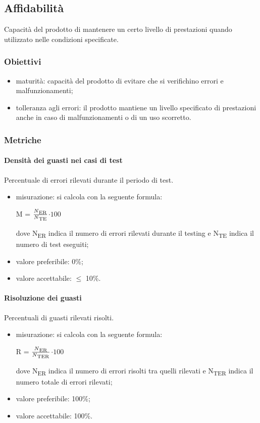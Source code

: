 	\subsection{Affidabilità}
	Capacità del prodotto di mantenere un certo livello di prestazioni quando utilizzato nelle condizioni specificate.
		\subsubsection{Obiettivi}
		\begin{itemize}
			\item maturità: capacità del prodotto di evitare che si verifichino errori e malfunzionamenti;
			\item tolleranza agli errori: il prodotto mantiene un livello specificato di prestazioni anche in caso di malfunzionamenti o di un uso scorretto.
		\end{itemize}
		\subsubsection{Metriche}
			\paragraph{Densità dei guasti nei casi di test}
			Percentuale di errori rilevati durante il periodo di test.
			\begin{itemize}
			\item misurazione: si calcola con la seguente formula: \\
			\centerline{ M =  \(\frac{N\textsubscript{ER}}{N\textsubscript{TE}} \)$ \cdot 100$ }
			dove N\textsubscript{ER} indica il numero di errori rilevati durante il testing e N\textsubscript{TE} indica il numero di test eseguiti;
			\item valore preferibile: 0\%;
			\item valore accettabile: $\leq$ 10\%.
			\end{itemize}
			\paragraph{Risoluzione dei guasti}
			Percentuali di guasti rilevati risolti.
			\begin{itemize}
			\item misurazione: si calcola con la seguente formula: \\
			\centerline{ R =  \(\frac{N\textsubscript{ER}}{N\textsubscript{TER}} \)$ \cdot 100$ }
			dove N\textsubscript{ER} indica il numero di errori risolti tra quelli rilevati e N\textsubscript{TER} indica il numero totale di errori rilevati;
			\item valore preferibile: 100\%;
			\item valore accettabile: 100\%.
			\end{itemize}
